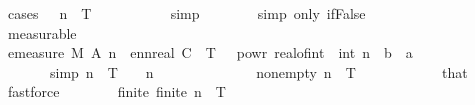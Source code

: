 \begin{isabellebody}
\ {\isacharparenleft}{\kern0pt}cases\ {\isachardoublequoteopen}{}\ {\isacharcircum}{\kern0pt}\ n\ {\isacharasterisk}{\kern0pt}\ T\ {\isacharless}{\kern0pt}\ {}{\isachardoublequoteclose}{\isacharparenright}{\kern0pt}\isanewline
\ \ \ \ \ \ \ \isamarkupfalse%
\ simp\isanewline
\ \ \ \ \ \ \isamarkupfalse%
\ {\isacharparenleft}{\kern0pt}simp\ only{\isacharcolon}{\kern0pt}\ if{\isacharunderscore}{\kern0pt}False{\isacharparenright}{\kern0pt}\isanewline
\ \ \ \ \ \ \ \ \isamarkupfalse%
\ measurable\isanewline
\ \ \ \ \ \ \isamarkupfalse%
\isanewline
\ \ \ \ \isamarkupfalse%
\ {\isachardoublequoteopen}emeasure\ {\isacharquery}{\kern0pt}M\ {\isacharparenleft}{\kern0pt}A\ n{\isacharparenright}{\kern0pt}\ {\isasymle}\ ennreal\ {\isacharparenleft}{\kern0pt}C\ {\isacharasterisk}{\kern0pt}\ T\ {\isacharasterisk}{\kern0pt}\ {}\ powr\ {\isacharparenleft}{\kern0pt}real{\isacharunderscore}{\kern0pt}of{\isacharunderscore}{\kern0pt}int\ {\isacharparenleft}{\kern0pt}{\isacharminus}{\kern0pt}\ int\ n{\isacharparenright}{\kern0pt}\ {\isacharasterisk}{\kern0pt}\ {\isacharparenleft}{\kern0pt}b\ {\isacharminus}{\kern0pt}\ a\ {\isacharasterisk}{\kern0pt}\ {\isasymgamma}{\isacharparenright}{\kern0pt}{\isacharparenright}{\kern0pt}{\isacharparenright}{\kern0pt}{\isachardoublequoteclose}\isanewline
\ \ \ \ \ \ \ {\isacharbrackleft}{\kern0pt}simp{\isacharbrackright}{\kern0pt}{\isacharcolon}{\kern0pt}\ {\isachardoublequoteopen}{}{\isacharcircum}{\kern0pt}n\ {\isacharasterisk}{\kern0pt}\ T\ {\isasymge}\ {}{\isachardoublequoteclose}\ \ n\isanewline
\ \ \ \ \isamarkupfalse%
\ {\isacharminus}{\kern0pt}\isanewline
\ \ \ \ \ \ \isamarkupfalse%
\ nonempty{\isacharcolon}{\kern0pt}\ {\isachardoublequoteopen}{\isacharbraceleft}{\kern0pt}{}{\isachardot}{\kern0pt}{\isachardot}{\kern0pt}{\isasymlfloor}{}{\isacharcircum}{\kern0pt}n\ {\isacharasterisk}{\kern0pt}\ T{\isasymrfloor}{\isacharbraceright}{\kern0pt}\ {\isasymnoteq}\ {\isacharbraceleft}{\kern0pt}{\isacharbraceright}{\kern0pt}{\isachardoublequoteclose}\isanewline
\ \ \ \ \ \ \ \ \isamarkupfalse%
\ that\ \isamarkupfalse%
\ fastforce\isanewline
\ \ \ \ \ \ \isamarkupfalse%
\ finite{\isacharcolon}{\kern0pt}\ {\isachardoublequoteopen}finite\ {\isacharbraceleft}{\kern0pt}{}{\isachardot}{\kern0pt}{\isachardot}{\kern0pt}{\isasymlfloor}{}{\isacharcircum}{\kern0pt}n\ {\isacharasterisk}{\kern0pt}\ T{\isasymrfloor}{\isacharbraceright}{\kern0pt}{\isachardoublequoteclose}\isanewline

\end{isabellebody}
